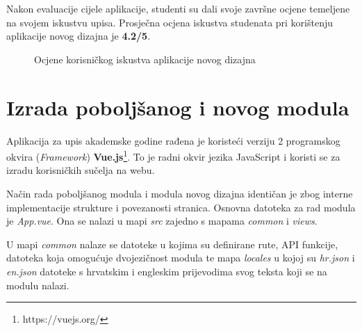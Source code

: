 \documentclass[times, utf8, zavrsni, numeric]{fer}
\begin{document}
    Nakon evaluacije cijele aplikacije, studenti su dali svoje završne ocjene temeljene na svojem iskustvu upisa. Prosječna ocjena iskustva studenata pri korištenju aplikacije novog dizajna je \textbf{4.2/5}.
    
    \begin{figure} [H]
      \centering
      \caption{Ocjene korisničkog iskustva aplikacije novog dizajna}
    \end{figure}


\chapter{Izrada poboljšanog i novog modula}
    Aplikacija za upis akademske godine rađena je koristeći verziju 2 programskog okvira (\textit{Framework}) \textbf{Vue.js}\footnote{https://vuejs.org/}. To je radni okvir jezika JavaScript i koristi se za izradu korisničkih sučelja na webu.
    
    Način rada poboljšanog modula i modula novog dizajna identičan je zbog interne implementacije strukture i povezanosti stranica. Osnovna datoteka za rad modula je \textit{App.vue}. Ona se nalazi u mapi \textit{src} zajedno s mapama \textit{common} i \textit{views}.
    
    U mapi \textit{common} nalaze se datoteke u kojima su definirane rute, API funkcije, datoteka koja omogućuje dvojezičnost modula te mapa \textit{locales} u kojoj su \textit{hr.json} i \textit{en.json} datoteke s hrvatskim i engleskim prijevodima svog teksta koji se na modulu nalazi.
    
\end{document}
